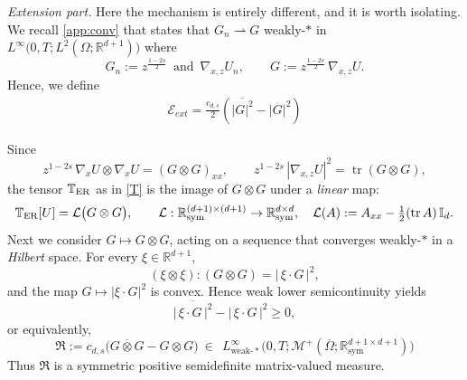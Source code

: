 \documentclass[12pt,a4paper,twoside]{article}
\newcommand{\Ov}[1]{\overline{#1}}
\newcommand{\Grad}{\nabla}
\newcommand{\lr}[1]{\left( #1 \right)}
\numberwithin{equation}{section}%
\begin{document}
\medskip
\noindent\emph{Extension part.} Here the mechanism is entirely different, and it is worth isolating. We recall \eqref{app:conv} that states that $G_n \rightharpoonup G$ weakly-$*$ in $L^\infty\big(0,T;L^2(\Omega;\mathbb R^{d+1})\big)$ where
\begin{equation*}
	G_n := z^{\frac{1-2s}{2}}\,\text{ and } \,\Grad_{x,z}U_n, \qquad G := z^{\frac{1-2s}{2}}\,\Grad_{x,z}U.
\end{equation*}
Hence, we define 
\begin{align}
	\mathcal E_{ext}=\frac{c_{d,s}}{2} \lr{\Ov{|G|^2} - |G|^2}
\end{align}
 

Since
\[
z^{1-2s}\,\Grad_x U\otimes\Grad_x U = (G\otimes G)_{xx},
\qquad
z^{1-2s}\,|\Grad_{x,z}U|^2 = \operatorname{tr}(G\otimes G),
\]
the tensor $\mathbb{T}_{\rm ER}$ as in \eqref{T} is the image of $G\otimes G$ under a \emph{linear} map:
\begin{equation}\label{T-linear}
	\mathbb T_{\rm ER}[U] = \mathcal L\big( G\otimes G \big),
	\qquad
	\mathcal L : \mathbb R^{(d+1)\times(d+1)}_{\mathrm{sym}} \to \mathbb R^{d\times d}_{\mathrm{sym}},
	\quad
	\mathcal L(A) := A_{xx} - \tfrac12 (\operatorname{tr}A)\, \mathbb I_d .
\end{equation}
Next we consider $G \mapsto G\otimes G$, acting on a sequence that converges weakly-$*$ in a \emph{Hilbert} space. For every $\xi\in\mathbb R^{d+1}$,
\[
(\xi\otimes\xi):(G\otimes G)=|\,\xi\cdot G\,|^2,
\]
and the map $G\mapsto |\xi\cdot G|^2$ is convex. Hence weak lower semicontinuity yields
\[
\Ov{|\,\xi\cdot G\,|^2}-|\,\xi\cdot G\,|^2\ge0,
\]
or equivalently,
\begin{equation}\label{Rfull}
	\mathfrak R := c_{d,s}\Big( \Ov{G\otimes G} - G\otimes G \Big)
	\ \in\ \ L^\infty_{\mathrm{weak}\text{-}*}\big(0,T;\mathcal M^+(\Ov{\Omega};\mathbb R^{{d+1}\times {d+1}}_{\mathrm{sym}})\big)
\end{equation}
Thus $\mathfrak R$ is a symmetric positive semidefinite matrix-valued measure. 
\end{document}

